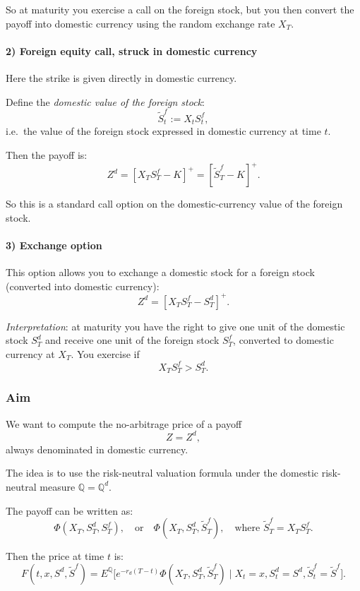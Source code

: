 \documentclass[12pt,a4paper]{article}
\theoremstyle{definition}
\begin{document}
So at maturity you exercise a call on the foreign stock, but you then convert the payoff into domestic currency using the random exchange rate $X_T$.

\paragraph{2) Foreign equity call, struck in domestic currency}

Here the strike is given directly in domestic currency.

Define the \emph{domestic value of the foreign stock}:
\[
\widetilde{S}_t^f := X_t S_t^f,
\]
i.e.\ the value of the foreign stock expressed in domestic currency at time $t$.

Then the payoff is:
\[
Z^d = [X_T S_T^f - K]^+ = [\widetilde{S}_T^f - K]^+.
\]

So this is a standard call option on the domestic-currency value of the foreign stock.

\paragraph{3) Exchange option}

This option allows you to exchange a domestic stock for a foreign stock (converted into domestic currency):
\[
Z^d = [X_T S_T^f - S_T^d]^+.
\]

\emph{Interpretation}: at maturity you have the right to give one unit of the domestic stock $S_T^d$ and receive one unit of the foreign stock $S_T^f$, converted to domestic currency at $X_T$. You exercise if
\[
X_T S_T^f > S_T^d.
\]

\subsubsection{Aim}

We want to compute the no-arbitrage price of a payoff
\[
Z = Z^d,
\]
always denominated in domestic currency.

The idea is to use the risk-neutral valuation formula under the domestic risk-neutral measure $\mathbb{Q} = \mathbb{Q}^d$.

The payoff can be written as:
\[
\Phi(X_T, S_T^d, S_T^f), \quad \text{or} \quad \Phi(X_T, S_T^d, \widetilde{S}_T^f), \quad \text{where } \widetilde{S}_T^f = X_T S_T^f.
\]

Then the price at time $t$ is:
\[
F(t, x, S^d, \widetilde{S}^f) = E^\mathbb{Q}\!\big[e^{-r_d(T-t)}\Phi(X_T, S_T^d, \widetilde{S}_T^f) \mid X_t = x, S_t^d = S^d, \widetilde{S}_t^f = \widetilde{S}^f\big].
\]
\end{document}
